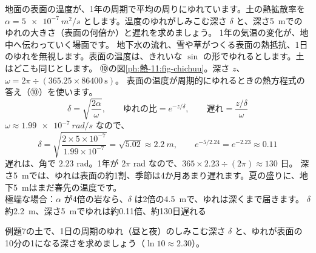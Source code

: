 \label{ph:熱-11:ex7}
\begin{phreidai}
地面の表面の温度が、1年の周期で平均の周りにゆれています。土の熱拡散率を $\alpha=\qty{5e-7}{m^2/s}$ とします。温度のゆれがしみこむ深さ $\delta$ と、深さ\qty{5}{m}でのゆれの大きさ（表面の何倍か）と遅れを求めましょう。
\phbamen
1年の気温の変化が、地中へ伝わっていく場面です。
\phmushi
地下水の流れ、雪や草がつくる表面の熱抵抗、1日のゆれを無視します。表面の温度は、きれいな $\sin$ の形でゆれるとします。土はどこも同じとします。
\phzu
⑩の図\ref{ph:熱-11:fig-chichuu}。深さ $z$、$\omega=2\pi\div(365.25\times86400\ \text{s})$。
\phriyu
表面の温度が周期的にゆれるときの熱方程式の答え（⑩）を使います。
\phtateru
\[\delta=\sqrt{\frac{2\alpha}{\omega}},\qquad\text{ゆれの比}=e^{-z/\delta},\qquad\text{遅れ}=\frac{z/\delta}{\omega}\]
\phtoku
$\omega\approx\qty{1.99e-7}{rad/s}$ なので、
\[\delta=\sqrt{\frac{2\times5\times10^{-7}}{1.99\times10^{-7}}}=\sqrt{5.02}\approx\qty{2.2}{m},\qquad e^{-5/2.24}=e^{-2.23}\approx0.11\]
遅れは、角で $2.23$ rad。1年が $2\pi$ rad なので、$365\times2.23\div(2\pi)\approx130$ 日。
\phtashikame
深さ\qty{5}{m}では、ゆれは表面の約1割、季節は4か月あまり遅れます。夏の盛りに、地下\qty{5}{m}はまだ春先の温度です。\\
極端な場合：$\alpha$ が4倍の岩なら、$\delta$ は2倍の\qty{4.5}{m}で、ゆれは深くまで届きます。
\kotae $\delta$ 約\qty{2.2}{m}、深さ\qty{5}{m}でゆれは約0.11倍、約130日遅れる
\end{phreidai}
\begin{jibun}
例題7の土で、1日の周期のゆれ（昼と夜）のしみこむ深さ $\delta$ と、ゆれが表面の10分の1になる深さを求めましょう（$\ln10\approx2.30$）。
\end{jibun}

